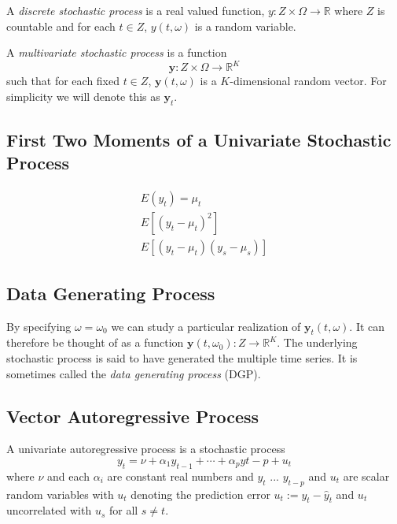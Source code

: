 \documentclass{article}
\begin{document}
            A \textit{discrete stochastic process} is a real valued function, 
            $y: Z \times \Omega \rightarrow \mathbb{R}$ where $Z$ is countable and
            for each $t \in Z$, $y(t, \omega)$ is a random variable.

            A \textit{multivariate stochastic process} is a function
            \[
                \mathbf{y}: Z \times \Omega \rightarrow \mathbb{R}^K
            \]
            such that for each fixed $t \in Z$, $\mathbf{y}(t, \omega)$ is a
            $K$-dimensional random vector. For simplicity we will denote
            this as $\mathbf{y}_t$.

        \subsection{First Two Moments of a Univariate Stochastic Process}

            \begin{align*}
                E(y_t) = \mu_t \\
                E[(y_t - \mu_t)^2] \\
                E[(y_t - \mu_t)(y_s - \mu_s)]
            \end{align*}

        \subsection{Data Generating Process}

            By specifying $\omega = \omega_0$ we can study a particular
            realization of $\mathbf{y}_t(t, \omega)$. It can therefore be 
            thought of as a function $\mathbf{y}(t, \omega_0): 
            Z \rightarrow \mathbb{R}^K$. The underlying stochastic process 
            is said to have generated the multiple time series. It is
            sometimes called the \textit{data generating process} (DGP).

        \subsection{Vector Autoregressive Process}

            A univariate autoregressive process is a stochastic process
            \[
                y_t = \nu + \alpha_1 y_{t-1} + \cdots + \alpha_p y{t - p} + u_t
            \]
            where $\nu$ and each $\alpha_i$ are constant real numbers and $y_t$
            ... $y_{t-p}$ and $u_t$ are scalar random variables with $u_t$ denoting the
            prediction error $u_t := y_t - \hat{y}_t$ and $u_t$ uncorrelated 
            with $u_s$ for all $s \neq t$.
\end{document}
